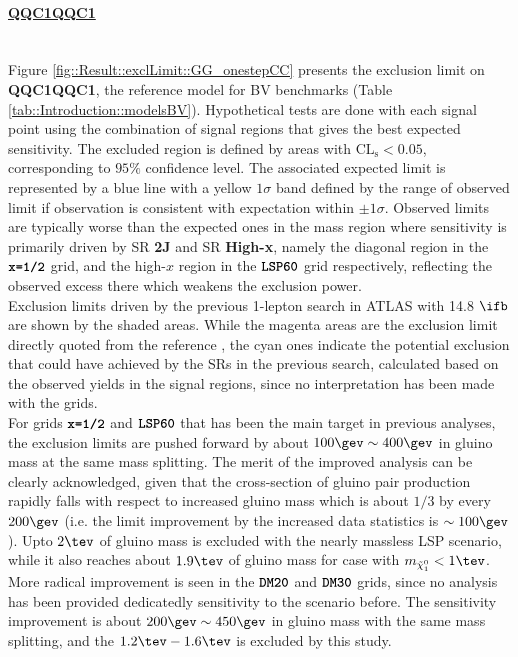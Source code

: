 \paragraph{\underline{\textbf{QQC1QQC1}}} \mbox{} \\
Figure \ref{fig::Result::exclLimit::GG_onestepCC} presents the exclusion limit on \textbf{QQC1QQC1}, the reference model for BV benchmarks (Table \ref{tab::Introduction::modelsBV}). Hypothetical tests are done with each signal point using the combination of signal regions that gives the best expected sensitivity. The excluded region is defined by areas with $\mathrm{CL_s}<0.05$, corresponding to $95\%$ confidence level. The associated expected limit is represented by a blue line with a yellow $1\sigma$ band defined by the range of observed limit if observation is consistent with expectation within $\pm1\sigma$. Observed limits are typically worse than the expected ones in the mass region where sensitivity is primarily driven by SR \textbf{2J} and SR \textbf{High-x}, namely the diagonal region in the $\mathrm{\textbf{\texttt{x=1/2}}}$ grid, and the high-$x$ region in the $\mathrm{\textbf{\texttt{LSP60}}}$ grid respectively, reflecting the observed excess there which weakens the exclusion power.  \\

Exclusion limits driven by the previous 1-lepton search in ATLAS with 14.8 $\ifb$ \cite{strong1L_ICHEP2016_CONF} are shown by the shaded areas. While the magenta areas are the exclusion limit directly quoted from the reference \cite{strong1L_ICHEP2016_CONF}, the cyan ones indicate the potential exclusion that could have achieved by the SRs in the previous search, calculated based on the observed yields in the signal regions, since no interpretation has been made with the grids.  \\

For grids $\mathrm{\textbf{\texttt{x=1/2}}}$ and $\mathrm{\textbf{\texttt{LSP60}}}$ that has been the main target in previous analyses, 
the exclusion limits are pushed forward by about $100\gev\sim400\gev$ in gluino mass at the same mass splitting.
The merit of the improved analysis can be clearly acknowledged, 
given that the cross-section of gluino pair production rapidly falls with respect to increased gluino mass which is about $1/3$ by every $200\gev$ (i.e. the limit improvement by the increased data statistics is $\sim 100 \gev$). 
Upto $2\tev$ of gluino mass is excluded with the nearly massless LSP scenario, 
while it also reaches about $1.9\tev$ of gluino mass for case with $\mLSP<1\tev$. 
More radical improvement is seen in the $\mathrm{\textbf{\texttt{DM20}}}$ and $\mathrm{\textbf{\texttt{DM30}}}$ grids, since no analysis has been provided dedicatedly sensitivity to the scenario before. The sensitivity improvement is about $200\gev\sim450\gev$ in gluino mass with the same mass splitting, and the $1.2\tev-1.6\tev$ is excluded by this study. 

